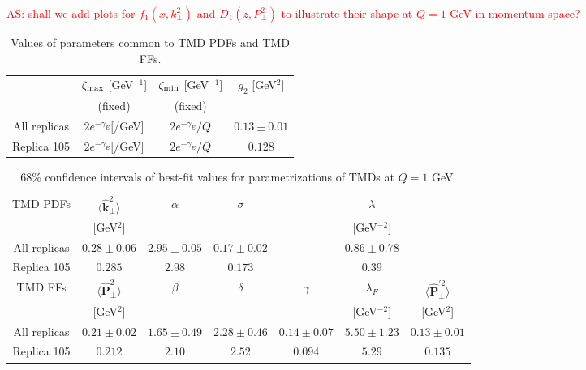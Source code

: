 \documentclass[aps,preprintnumbers,showpacs,nofootinbib,superscriptaddress,floatfix]{revtex4}
\newcommand{\T}{\perp}
\newcommand{\bb}{\zeta}
\begin{document}
\textcolor{red}{AS: shall we add plots for $f_1(x,k_\perp^2)$ and $D_1(z,P_\perp^2)$ to illustrate their shape at $Q=1$ GeV in momentum space?}
\begin{table}[h!]
\small
  \centering
  \begin{tabular}{|c|c|c|c|}
\hline
\hline
&$\bb_{\rm max}$ [GeV$^{-1}$] & $\bb_{\rm min}$ [GeV$^{-1}$] &  $g_2$ {[GeV$^2$]} 
 \\ 
& (fixed)     & (fixed)   &                            \\
\hline
All replicas & $2 e^{-\gamma_E}[/$GeV]& $2 e^{-\gamma_E}/Q$  & $0.13 \pm 0.01$  \\
\hline
Replica 105 &  $2 e^{-\gamma_E}[/$GeV]& $2 e^{-\gamma_E}/Q$  & $0.128$  \\
\hline
\hline
\end{tabular}
\caption{Values of parameters common to TMD PDFs and TMD FFs.}
\label{t:fl_ind_parcommon}
\end{table}
\begin{table}[h!]
\small
  \centering
  \begin{tabular}{|c||c|c|c|c|c|c|}
\hline
\hline
TMD PDFs&  $\big \langle \hat{\bm{k}}_{\T}^2 \big \rangle$ 
& $\alpha$ & $\sigma$ & & $\lambda$ &  
 \\ 
        & {[GeV$^2$]}                               &
       &      &  &{[GeV$^{-2}$]} & \\
\hline
All replicas &  $0.28\pm 0.06$ & $2.95\pm 0.05$ & $0.17\pm 0.02$ & 
                & $0.86\pm 0.78$ & 
\\
\hline
Replica 105  &  $0.285$ & $2.98$ & $0.173$ & & $0.39$ & \\
\hline
\hline
TMD FFs&  $\big \langle \hat{\bm{P}}_{\perp}^2 \big \rangle$ &
$\beta$ & $\delta$ & $\gamma$ & $\lambda_F$ & $\big \langle
\hat{\bm{P}}_{\perp}^{\prime 2} \big \rangle$
 \\ 
        & {[GeV$^2$]} &            &        & &{[GeV$^{-2}$]} &{[GeV$^2$]}    \\
\hline
All replicas & $0.21\pm 0.02$ & $1.65\pm 0.49$ & $2.28\pm 0.46$ & $0.14\pm 0.07$ &
$5.50\pm 1.23$ & $0.13\pm 0.01$ \\
\hline
Replica 105   &  
 $0.212$ & $2.10$ & $2.52$ & $0.094$ & $5.29$ & $0.135$ \\
\hline
\hline
\end{tabular}
\caption{68\% confidence intervals of best-fit values for parametrizations of TMDs at $Q=1$ GeV.}
\label{t:fl_ind_par_TMD}
\end{table}
\end{document}
